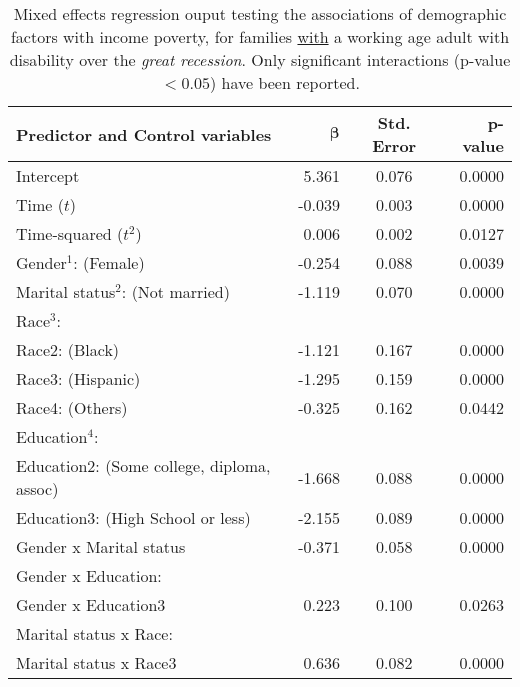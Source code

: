 \begin{table}[H]
\centering
\caption{Mixed effects regression ouput testing the associations of demographic factors with income poverty, for families {\underline{with}} a working age adult with disability over the {\emph{great recession}}. Only significant interactions (p-value $< 0.05$) have been reported.} 
\begin{threeparttable}
\begin{tabular}{lrcr}
  \hline
  {\bf{Predictor and Control variables}} & $\mathbf{\beta}$ & {\bf{Std. Error}} & {\bf{p-value}} \\ 
  \hline
  Intercept 						& 5.361		& 0.076 & 0.0000 \\ 
  Time ($t$) 						& -0.039 	& 0.003 & 0.0000 \\ 
  Time-squared ($t^2$) 					& 0.006		& 0.002 & 0.0127 \\ 
  Gender$^1$: (Female) 					& -0.254 	& 0.088 & 0.0039 \\ 
  Marital status$^2$: (Not married) 			& -1.119 	& 0.070 & 0.0000 \\ 
Race$^3$: & & & \\
  \hspace{5pt} Race2: (Black) 				& -1.121 	& 0.167 & 0.0000 \\ 
  \hspace{5pt}   Race3: (Hispanic) 			& -1.295 	& 0.159 & 0.0000 \\ 
  \hspace{5pt}   Race4: (Others) 			& -0.325 	& 0.162 & 0.0442 \\ 
Education$^4$: & & & \\
  \hspace{5pt}   Education2: (Some college, diploma, assoc) & -1.668 	& 0.088 & 0.0000 \\ 
  \hspace{5pt}   Education3: (High School or less) 	& -2.155 	& 0.089 & 0.0000 \\ 
  Gender x Marital status 				& -0.371 	& 0.058 & 0.0000 \\ 
Gender x Education: & & & \\
  \hspace{5pt}   Gender x Education3 			& 0.223		& 0.100 & 0.0263 \\ 
Marital status x Race: & & & \\
  \hspace{5pt}   Marital status x Race3 		& 0.636		& 0.082 & 0.0000 \\ 

\end{tabular}
\end{threeparttable}
\end{table}
